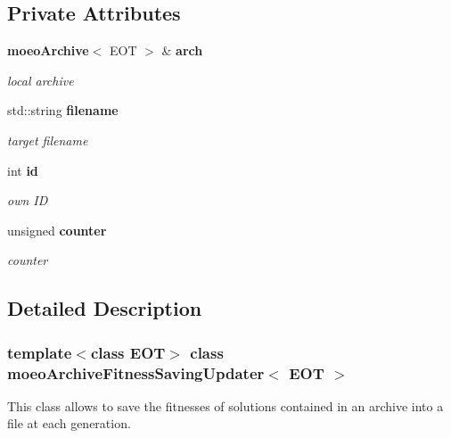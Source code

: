 \subsection*{Private Attributes}
\begin{CompactItemize}
\item 
{\bf moeo\-Archive}$<$ EOT $>$ \& {\bf arch}\label{classmoeoArchiveFitnessSavingUpdater_b8eeccd7b43eb11e36cee2ec7d7c9c21}

\begin{CompactList}\small\item\em local archive \item\end{CompactList}\item 
std::string {\bf filename}\label{classmoeoArchiveFitnessSavingUpdater_17c82bea631bf9ff635a3698d08907f0}

\begin{CompactList}\small\item\em target filename \item\end{CompactList}\item 
int {\bf id}\label{classmoeoArchiveFitnessSavingUpdater_e064861d67aae0747c2d8ffab90cbfbf}

\begin{CompactList}\small\item\em own ID \item\end{CompactList}\item 
unsigned {\bf counter}\label{classmoeoArchiveFitnessSavingUpdater_e32fab4bb828d40fe19c283dbd2a6423}

\begin{CompactList}\small\item\em counter \item\end{CompactList}\end{CompactItemize}


\subsection{Detailed Description}
\subsubsection*{template$<$class EOT$>$ class moeo\-Archive\-Fitness\-Saving\-Updater$<$ EOT $>$}

This class allows to save the fitnesses of solutions contained in an archive into a file at each generation. 



